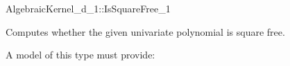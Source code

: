 \begin{ccRefConcept}{AlgebraicKernel_d_1::IsSquareFree_1}

\ccDefinition
Computes whether the given univariate polynomial is square free. 
 
\ccRefines 
{}  

A model of this type must provide:

\ccOperations
{}

{}


\end{ccRefConcept} 



